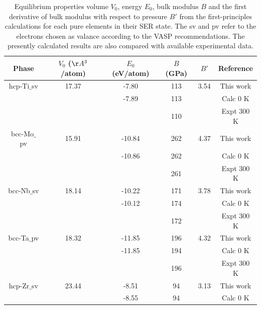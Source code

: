 \newpage
\begin{table}[H]
	\caption{Equilibrium properties volume $V_{0}$, energy $E_{0}$, bulk modulus $B$ and the first derivative of bulk modulus with respect to pressure $B'$ from the first-principles calculations for each pure elements in their SER state. The sv and pv refer to the electrons chosen as valance according to the VASP recommendations. The presently calculated results are also compared with available experimental data.}
	\centering
	\begin{tabular}{ c c c c c c }
		\hline
		Phase & $V_{0}$ ($\AA^{3}$/atom) & $E_{0}$ (eV/atom) & $B$ (GPa) & $B'$ & Reference \\
		\hline
		hcp-Ti$\_$sv & 17.37 & -7.80 & 113 & 3.54 & This work\\
                 & & -7.89 & 113 & & Calc 0 K \cite{Schmitz-Pranghe1968_792,MaterialsProject}\\
                 & & & 110 & & Expt 300 K \cite{WolframResearch}\\
        bcc-Mo$\_$pv & 15.91 & -10.84 & 262 & 4.37 & This work\\
                 & & -10.86 & 262 & & Calc 0 K \cite{MaterialsProject,Chen_Y2009_794}\\        
                 & & & 261 & & Expt 300 K \cite{Bolef1961}\\
        bcc-Nb$\_$sv & 18.14 & -10.22 & 171 & 3.78 & This work\\
                 & & -10.12 & 174 & & Calc 0 K \cite{MaterialsProject,Neuburger1936_127}\\           
                 & & & 172 & & Expt 300 K \cite{Bolef1961} \\
        bcc-Ta$\_$pv & 18.32 & -11.85 & 196 & 4.32 & This work\\
                 & & -11.85 & 194 & & Calc 0 K \cite{MaterialsProject,Neuburger1936_262}\\
                 & & & 196 & & Expt 300 K \cite{Bolef1961}\\                     
        hcp-Zr$\_$sv & 23.44& -8.51 & 94 & 3.13 & This work\\
                 & & -8.55 & 94 & & Calc 0 K \cite{MaterialsProject,Treco1953_964,Bergerhoff1983,Karlsruhe}\\
		\hline
	\end{tabular}
	\label{Ch3-table:pspureele}
\end{table}

